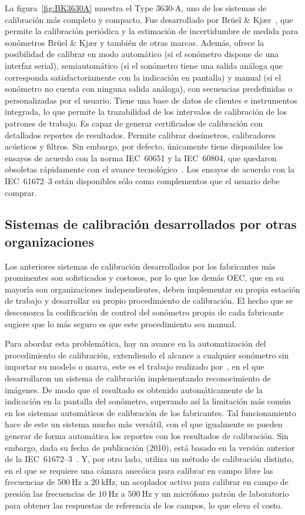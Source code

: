 La figura~\ref{fig:BK3630A} muestra el Type 3630-A, uno de los sistemas de calibración más completo y compacto.
Fue desarrollado por Brüel \& Kjær~\citeyearpar{BruelKjaer2000}, que permite la calibración periódica y la estimación
de incertidumbre de medida para sonómetros Brüel \& Kjær y también de otras marcas.
Además, ofrece la posibilidad de calibrar en modo automático (si el sonómetro dispone de una interfaz serial),
semiautomático (si el sonómetro tiene una salida análoga que corresponda satisfactoriamente con la indicación en
pantalla) y manual (si el sonómetro no cuenta con ninguna salida análoga), con secuencias predefinidas o personalizadas
por el usuario.
Tiene una base de datos de clientes e instrumentos integrada, lo que permite la trazabilidad de los intervalos de
calibración de los patrones de trabajo.
Es capaz de generar certificados de calibración con detallados reportes de resultados.
Permite calibrar dosímetros, calibradores acústicos y filtros.
Sin embargo, por defecto, únicamente tiene disponibles los ensayos de acuerdo con la norma \mbox{IEC 60651} y la
\mbox{IEC 60804}, que quedaron obsoletas rápidamente con el avance tecnológico~\citep{Beyers2014}.
Los ensayos de acuerdo con la \mbox{IEC 61672--3} están disponibles sólo como complementos que el usuario debe comprar.

\subsection{Sistemas de calibración desarrollados por otras organizaciones}
Los anteriores sistemas de calibración desarrollados por los fabricantes más prominentes son sofisticados y costosos,
por lo que los demás OEC, que en su mayoría son organizaciones independientes, deben implementar su propia estación de
trabajo y desarrollar su propio procedimiento de calibración.
El hecho que se desconozca la codificación de control del sonómetro propia de cada fabricante sugiere que lo más seguro
es que este procedimiento sea manual.

Para abordar esta problemática, hay un avance en la automatización del procedimiento de calibración, extendiendo el
alcance a cualquier sonómetro sin importar su modelo o marca, este es el trabajo realizado por~\cite{Zhong2010},
en el que desarrollaron un sistema de calibración implementando reconocimiento de imágenes.
De modo que el resultado es obtenido automáticamente de la indicación en la pantalla del sonómetro, superando así la
limitación más común en los sistemas automáticos de calibración de los fabricantes.
Tal funcionamiento hace de este un sistema mucho más versátil, con el que igualmente se pueden generar de forma
automática los reportes con los resultados de calibración.
Sin embargo, dada su fecha de publicación (2010), está basado en la versión anterior de la
\mbox{IEC 61672--3}~\citeyearpar{IEC_TC29_2013_3}.
Y, por otro lado, utiliza un método de calibración distinto, en el que se requiere una cámara anecóica para calibrar en
campo libre las frecuencias de $\qty{500}{\Hz}$ a $\qty{20}{\kHz}$, un acoplador activo para calibrar en campo de
presión las frecuencias de $\qty{10}{\Hz}$ a $\qty{500}{\Hz}$ y un micrófono patrón de laboratorio para obtener las
respuestas de referencia de los campos, lo que eleva el costo.

